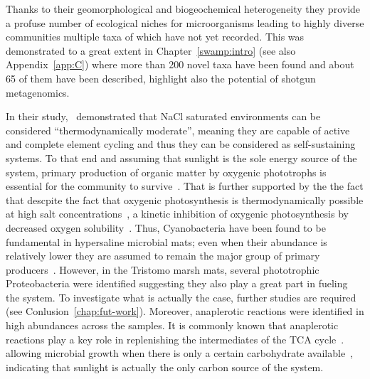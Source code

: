    Thanks to their geomorphological and biogeochemical heterogeneity
   they provide a profuse number of ecological niches for microorganisms
   leading to highly diverse communities multiple taxa of which have not yet recorded.
   This was demonstrated to a great extent in Chapter~\ref{swamp:intro} (see also Appendix~\ref{app:C})
   where more than 200 novel taxa have been found and about 65 of them have 
   been described, highlight also the potential of shotgun metagenomics. 

   In their study,~\citeauthor{lee_nacl-saturated_2018} demonstrated 
   that NaCl saturated environments can be considered 
   “thermodynamically moderate”, meaning they are capable of 
   active and complete element cycling  
   and thus they can be considered as self-sustaining systems.
   To that end and assuming 
   that sunlight is the sole energy source of the system, 
   primary production of organic matter 
   by oxygenic phototrophs is essential for the community to survive~\citep{meier_limitation_2021}. 
   That is further supported by the the fact that 
   descpite the fact that oxygenic photosynthesis is thermodynamically possible 
   at high salt concentrations~\citep{oren_thermodynamic_2011}, 
   a kinetic inhibition of oxygenic photosynthesis 
   by decreased oxygen solubility~\citep{abed2007effect}.
   Thus, Cyanobacteria have been found to be fundamental in hypersaline 
   microbial mats; 
   even when their abundance is relatively lower  
   they are assumed to remain the major group of 
   primary producers~\citep{bolhuis_molecular_2014}.
   However, in the Tristomo marsh mats, several phototrophic 
   Proteobacteria were identified suggesting they also play a great part 
   in fueling the system. 
   To investigate what is actually the case, further studies are required (see Conlusion~\ref{chap:fut-work}).
   Moreover, anaplerotic reactions were identified in high abundances across the samples.
   It is commonly known that anaplerotic reactions play a key role 
   in replenishing the intermediates of the TCA cycle~\citep{owen2002key}.  
   allowing microbial growth 
   when there is only a certain
   carbohydrate available~\citep{choi_distinct_2016}, indicating that sunlight 
   is actually the only carbon source of the system. 

